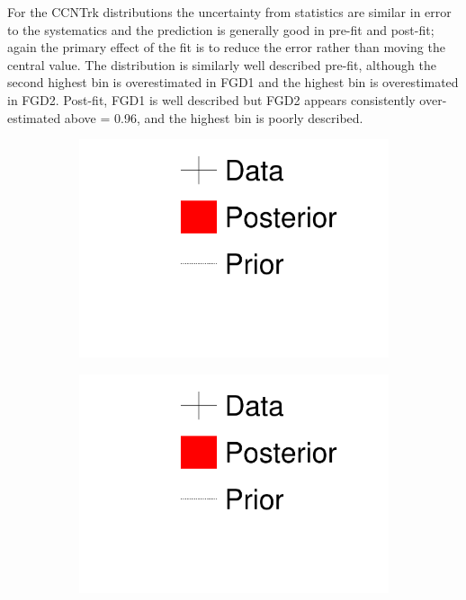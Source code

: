 For the CCNTrk distributions the uncertainty from statistics are similar in error to the systematics and the prediction is generally good in \pmu pre-fit and post-fit; again the primary effect of the fit is to reduce the error rather than moving the central value. The \cosmu distribution is similarly well described pre-fit, although the second highest \cosmu bin is overestimated in FGD1 and the highest \cosmu bin is overestimated in FGD2. Post-fit, FGD1 is well described but FGD2 appears consistently over-estimated above \cosmu= 0.96, and the highest \cosmu bin is poorly described.
\begin{figure}[h]
	\begin{subfigure}[t]{0.15\textwidth}
		\includegraphics[width=\textwidth, trim={0mm 90mm 0mm 0mm}, clip,page=1]{figures/mach3/1D_legend_Data_Posterior_Prior}
	\end{subfigure}
	\begin{subfigure}[t]{0.15\textwidth}
		\includegraphics[width=\textwidth, trim={0mm 45mm 0mm 50mm}, clip,page=1]{figures/mach3/1D_legend_Data_Posterior_Prior}

\end{subfigure}
\end{figure}

